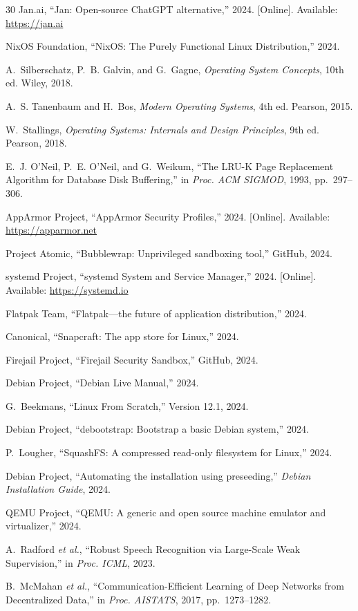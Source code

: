\documentclass[conference]{IEEEtran}
\begin{document}
\begin{thebibliography}{30}
Jan.ai, ``Jan: Open-source ChatGPT alternative,'' 2024. [Online]. Available: \url{https://jan.ai}

NixOS Foundation, ``NixOS: The Purely Functional Linux Distribution,'' 2024.

A.~Silberschatz, P.~B. Galvin, and G.~Gagne, \textit{Operating System Concepts}, 10th ed. Wiley, 2018.

A.~S. Tanenbaum and H.~Bos, \textit{Modern Operating Systems}, 4th ed. Pearson, 2015.

W.~Stallings, \textit{Operating Systems: Internals and Design Principles}, 9th ed. Pearson, 2018.

E.~J. O'Neil, P.~E. O'Neil, and G.~Weikum, ``The LRU-K Page Replacement Algorithm for Database Disk Buffering,'' in \textit{Proc. ACM SIGMOD}, 1993, pp.~297--306.

AppArmor Project, ``AppArmor Security Profiles,'' 2024. [Online]. Available: \url{https://apparmor.net}

Project Atomic, ``Bubblewrap: Unprivileged sandboxing tool,'' GitHub, 2024.

systemd Project, ``systemd System and Service Manager,'' 2024. [Online]. Available: \url{https://systemd.io}

Flatpak Team, ``Flatpak---the future of application distribution,'' 2024.

Canonical, ``Snapcraft: The app store for Linux,'' 2024.

Firejail Project, ``Firejail Security Sandbox,'' GitHub, 2024.

Debian Project, ``Debian Live Manual,'' 2024.

G.~Beekmans, ``Linux From Scratch,'' Version 12.1, 2024.

Debian Project, ``debootstrap: Bootstrap a basic Debian system,'' 2024.

P.~Lougher, ``SquashFS: A compressed read-only filesystem for Linux,'' 2024.

Debian Project, ``Automating the installation using preseeding,'' \textit{Debian Installation Guide}, 2024.

QEMU Project, ``QEMU: A generic and open source machine emulator and virtualizer,'' 2024.

A.~Radford \textit{et al.}, ``Robust Speech Recognition via Large-Scale Weak Supervision,'' in \textit{Proc. ICML}, 2023.

B.~McMahan \textit{et al.}, ``Communication-Efficient Learning of Deep Networks from Decentralized Data,'' in \textit{Proc. AISTATS}, 2017, pp.~1273--1282.

\end{thebibliography}

\balance
\end{document}
